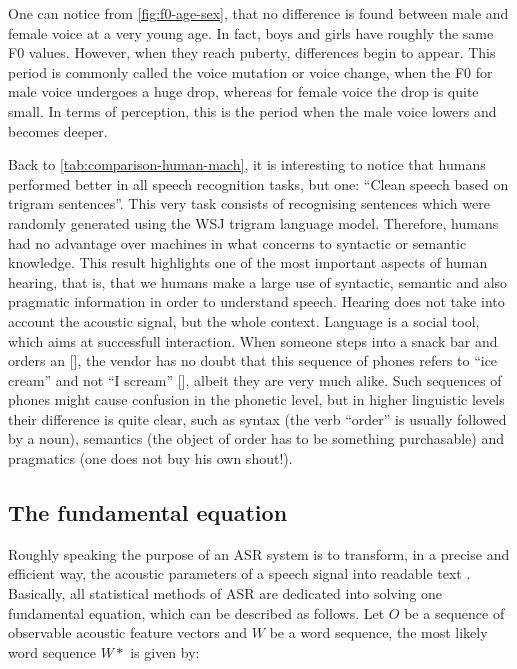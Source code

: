 One can notice from \autoref{fig:f0-age-sex}, that no difference is found between male and female voice at a very young age. 
In fact, boys and girls have roughly the same \ac{F0} values. However, when they reach puberty, differences begin to appear. 
This period is commonly called the voice mutation or voice change, when the \ac{F0} for male voice undergoes a huge drop, whereas 
for female voice the drop is quite small. In terms of perception, this is the period when the male voice lowers and becomes deeper.

Back to \autoref{tab:comparison-human-mach}, it is interesting to notice that humans
performed better in all speech recognition tasks, but one: ``Clean speech based on trigram sentences''.
This very task consists of recognising sentences which were randomly generated using the WSJ trigram language model. 
Therefore, humans had no advantage over machines in what concerns to syntactic or semantic knowledge. 
This result highlights one of the most important aspects of human hearing, that is, that we humans make a large use of syntactic, 
semantic and also pragmatic information in order to understand speech. Hearing does not take into account 
the acoustic signal, but the whole context. Language is a social tool, which aims at successfull interaction. When someone steps into a snack bar and orders 
an [], the vendor has no doubt that this sequence of phones refers to ``ice cream'' and not ``I scream'' [], 
albeit they are very much alike. Such sequences of phones might cause confusion in the phonetic level, but
in higher linguistic levels their difference is quite clear, such as syntax (the verb ``order'' is usually followed by a noun), semantics 
(the object of order has to be something purchasable) and pragmatics (one does not buy his own shout!).

\subsection{The fundamental equation}

Roughly speaking the purpose of an \ac{ASR} system is to transform, in a precise and efficient way, the acoustic parameters of a speech signal into readable text \cite{Rabiner2007}.
Basically, all statistical methods of \ac{ASR} are dedicated into solving one fundamental 
equation, which can be described as follows. Let $O$ be a sequence of observable acoustic 
feature vectors and $W$ be a word sequence, the most likely word sequence $W*$ is given by:

